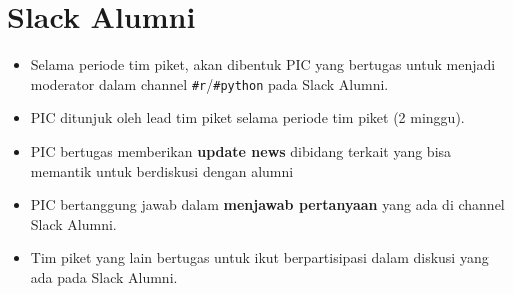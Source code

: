 \documentclass[
]{book}
\providecommand{\tightlist}{%
  \setlength{\itemsep}{0pt}\setlength{\parskip}{0pt}}
\begin{document}
\hypertarget{slack-alumni}{%
\section{Slack Alumni}\label{slack-alumni}}

\begin{itemize}
\tightlist
\item
  Selama periode tim piket, akan dibentuk PIC yang bertugas untuk menjadi moderator dalam channel \texttt{\#r}/\texttt{\#python} pada Slack Alumni.
\item
  PIC ditunjuk oleh lead tim piket selama periode tim piket (2 minggu).
\item
  PIC bertugas memberikan \textbf{update news} dibidang terkait yang bisa memantik untuk berdiskusi dengan alumni
\item
  PIC bertanggung jawab dalam \textbf{menjawab pertanyaan} yang ada di channel Slack Alumni.
\item
  Tim piket yang lain bertugas untuk ikut berpartisipasi dalam diskusi yang ada pada Slack Alumni.
\end{itemize}

  
\end{document}
